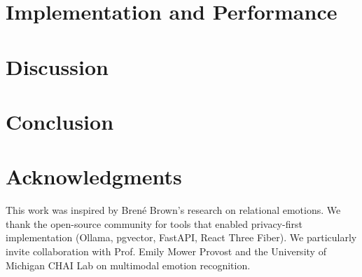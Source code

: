 \documentclass[10pt,twocolumn]{article}
\begin{document}
\section{Implementation and Performance}
\label{sec:implementation}


\section{Discussion}
\label{sec:discussion}


\section{Conclusion}
\label{sec:conclusion}


\section*{Acknowledgments}
This work was inspired by Brené Brown's research on relational emotions. We thank the open-source community for tools that enabled privacy-first implementation (Ollama, pgvector, FastAPI, React Three Fiber). We particularly invite collaboration with Prof. Emily Mower Provost and the University of Michigan CHAI Lab on multimodal emotion recognition.



\end{document}
